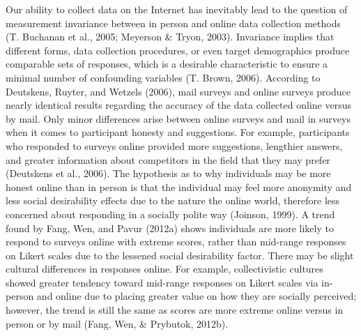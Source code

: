 \documentclass[english,man, mask]{apa6}
\theoremstyle{definition}
\theoremstyle{definition}
\theoremstyle{definition}
\theoremstyle{remark}
\begin{document}
Our ability to collect data on the Internet has inevitably lead to the
question of measurement invariance between in person and online data
collection methods (T. Buchanan et al., 2005; Meyerson \& Tryon, 2003).
Invariance implies that different forms, data collection procedures, or
even target demographics produce comparable sets of responses, which is
a desirable characteristic to ensure a minimal number of confounding
variables (T. Brown, 2006). According to Deutskens, Ruyter, and Wetzels
(2006), mail surveys and online surveys produce nearly identical results
regarding the accuracy of the data collected online versus by mail. Only
minor differences arise between online surveys and mail in surveys when
it comes to participant honesty and suggestions. For example,
participants who responded to surveys online provided more suggestions,
lengthier answers, and greater information about competitors in the
field that they may prefer (Deutskens et al., 2006). The hypothesis as
to why individuals may be more honest online than in person is that the
individual may feel more anonymity and less social desirability effects
due to the nature the online world, therefore less concerned about
responding in a socially polite way (Joinson, 1999). A trend found by
Fang, Wen, and Pavur (2012a) shows individuals are more likely to
respond to surveys online with extreme scores, rather than mid-range
responses on Likert scales due to the lessened social desirability
factor. There may be slight cultural differences in responses online.
For example, collectivistic cultures showed greater tendency toward
mid-range responses on Likert scales via in-person and online due to
placing greater value on how they are socially perceived; however, the
trend is still the same as scores are more extreme online versus in
person or by mail (Fang, Wen, \& Prybutok, 2012b).
\end{document}

